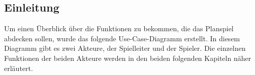 \subsection{Einleitung}
\label{sec:fachkonzept-usecase-einleitung}

Um einen Überblick über die Funktionen zu bekommen, die das Planspiel abdecken sollen, wurde das folgende Use-Case-Diagramm erstellt. In diesem Diagramm gibt es zwei Akteure, der Spielleiter und der Spieler. Die einzelnen Funktionen der beiden Akteure werden in den beiden folgenden Kapiteln näher erläutert.